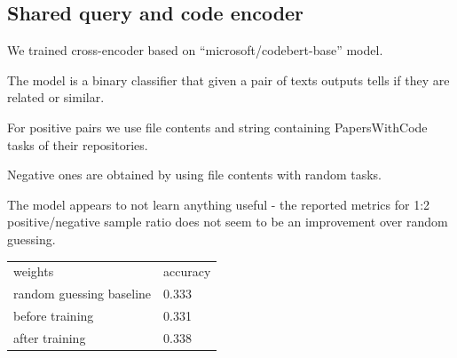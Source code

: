 \documentclass[11pt]{report}
\begin{document}
\subsection{Shared query and code encoder}

\label{shared_encoder}

We trained cross-encoder based on ``microsoft/codebert-base'' model. 

The model is a binary classifier that given a pair of texts outputs tells if
they are related or similar.

For positive pairs we use file contents and string containing PapersWithCode tasks of their repositories.

Negative ones are obtained by using file contents with random tasks.

The model appears to not learn anything useful - the reported metrics for 
1:2 positive/negative sample ratio does not seem to be an improvement over random guessing. 

\begin{center}
  \begin{tabular}{|l|l|}
    \toprule
    weights & accuracy \\
    random guessing baseline &     0.333 \\
    \hline
    before training &  0.331  \\
    \hline
    after training &     0.338  \\
    \bottomrule
  \end{tabular}
\end{center}
\end{document}
